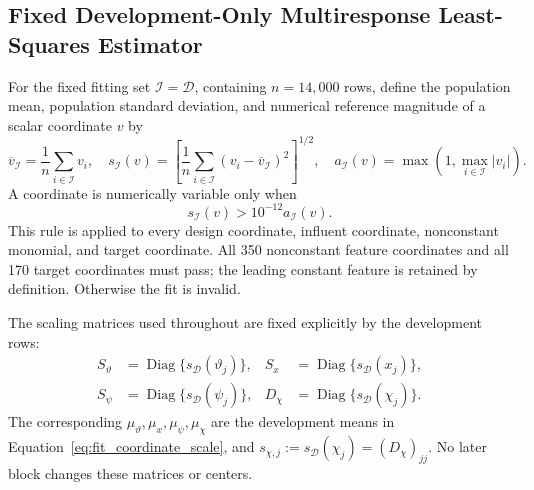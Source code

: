 \documentclass[a4paper,fleqn]{cas-sc}
\begin{document}
\subsection{Fixed Development-Only Multiresponse Least-Squares Estimator}

For the fixed fitting set $\mathcal I=\mathcal D$, containing $n=14{,}000$ rows, define the population mean, population standard deviation, and numerical reference magnitude of a scalar coordinate $v$ by
\begin{equation}
\label{eq:fit_coordinate_scale}
\overline v_{\mathcal I}=\frac1n\sum_{i\in\mathcal I}v_i,
\quad
s_{\mathcal I}(v)=\left[\frac1n\sum_{i\in\mathcal I}(v_i-\overline v_{\mathcal I})^2\right]^{1/2},
\quad
a_{\mathcal I}(v)=\max\!\left(1,\max_{i\in\mathcal I}|v_i|\right).
\end{equation}
A coordinate is numerically variable only when
\begin{equation}
\label{eq:nonzero_variance_rule}
s_{\mathcal I}(v)>10^{-12}a_{\mathcal I}(v).
\end{equation}
This rule is applied to every design coordinate, influent coordinate, nonconstant monomial, and target coordinate. All 350 nonconstant feature coordinates and all 170 target coordinates must pass; the leading constant feature is retained by definition. Otherwise the fit is invalid.

The scaling matrices used throughout are fixed explicitly by the development rows:
\begin{equation}
\begin{aligned}
S_\vartheta&=\operatorname{Diag}\{s_{\mathcal D}(\vartheta_j)\},&
S_x&=\operatorname{Diag}\{s_{\mathcal D}(x_j)\},\\
S_\psi&=\operatorname{Diag}\{s_{\mathcal D}(\psi_j)\},&
D_\chi&=\operatorname{Diag}\{s_{\mathcal D}(\chi_j)\}.
\end{aligned}
\end{equation}
The corresponding $\mu_\vartheta,\mu_x,\mu_\psi,\mu_\chi$ are the development means in Equation~\eqref{eq:fit_coordinate_scale}, and $s_{\chi,j}:=s_{\mathcal D}(\chi_j)=(D_\chi)_{jj}$. No later block changes these matrices or centers.
\end{document}

